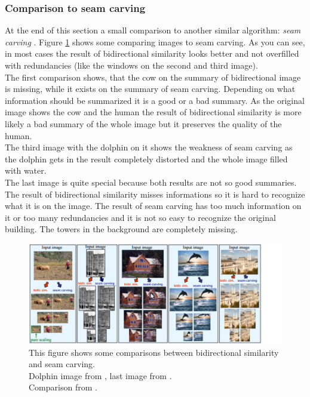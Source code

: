 \subsubsection*{Comparison to seam carving}
At the end of this section a small comparison to another similar algorithm: \textit{seam carving} \cite{seamcarv}.
Figure \ref{fig:Seam carving} shows some comparing images to seam carving. As you can see, in most cases the result of bidirectional similarity looks better and not overfilled with redundancies (like the windows on the second and third image).\\
The first comparison shows, that the cow on the summary of bidirectional image is missing, while it exists on the summary of seam carving. Depending on what information should be summarized it is a good or a bad summary. As the original image shows the cow and the human the result of bidirectional similarity is more likely a bad summary of the whole image but it preserves the quality of the human.\\
The third image with the dolphin on it shows the weakness of seam carving as the dolphin gets in the result completely distorted and the whole image filled with water.\\
The last image is quite special because both results are not so good summaries. The result of bidirectional similarity misses informations so it is hard to recognize what it is on the image. The result of seam carving has too much information on it or too many redundancies and it is not so easy to recognize the original building. The towers in the background are completely missing.\\


\begin{figure}[h]
\centering
\includegraphics[scale=0.95]{img/seamcarving}
\caption[Seam carving]{This figure shows some comparisons between bidirectional similarity and seam carving.\\ Dolphin image from \cite{seamcarv}, last image from \cite{wolf}.\\
Comparison from \cite{bisi}.}
\label{fig:Seam carving}
\end{figure}
